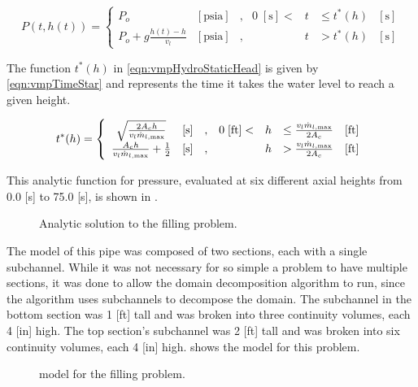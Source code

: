\begin{equation}
\label{eqn:vmpHydroStaticHead}
P(t, h(t))= 
 \left\{
\begin{array}{cclrcll}
P_o & [ \text{psia} ] & , & 0\; [\text{s}] < & t & \leq t^{*}(h) & [\text{s}] \\
P_o + g \frac{ h(t) - h }{ v_{l} } & [ \text{psia} ] & , &  & t & > t^{*}(h) & [\text{s}]
\end{array}\right.
\end{equation}

The function $t^{*}(h)$ in \eqref{eqn:vmpHydroStaticHead} is given by \eqref{eqn:vmpTimeStar} and represents the time it takes the water level to reach a given height.

\begin{equation}
\label{eqn:vmpTimeStar}
t^{*}(h)= 
 \left\{
\begin{array}{cclrcll}
\sqrt{\frac{2 A_c h}{v_{l} \dot{m}_{l,\text{max}}}} & [ \text{s} ] & , & 0\; [ \text{ft}] < & h & \leq \frac{v_l \dot{m}_{l,\text{max}}}{2 A_c} & [\text{ft}] \\
\frac{ A_c h }{v_{l} \dot{m}_{l,\text{max}}} + \onehalf & [ \text{s} ] & , &                & h & > \frac{v_l \dot{m}_{l,\text{max}}}{2 A_c} & [\text{ft}]
\end{array}\right.
\end{equation}

This analytic function for pressure, evaluated at six different axial heights from 0.0 [s] to 75.0 [s], is shown in .

\begin{figure}[h!tb]
\centering

\caption{Analytic solution to the filling problem.}
\label{fig:vmpAnalyticSol}
\end{figure}

The model of this pipe was composed of two sections, each with a single subchannel.
While it was not necessary for so simple a problem to have multiple sections, it was done to allow the domain decomposition algorithm to run, since the algorithm uses subchannels to decompose the domain.
The subchannel in the bottom section was 1 [ft] tall and was broken into three continuity volumes, each 4 [in] high.
The top section's subchannel was 2 [ft] tall and was broken into six continuity volumes, each 4 [in] high.
 shows the \cobra{} model for this problem.

\begin{figure}[h!tb]
\centering

\caption{\cobra{} model for the filling problem.}
\label{fig:fillModel}
\end{figure}


